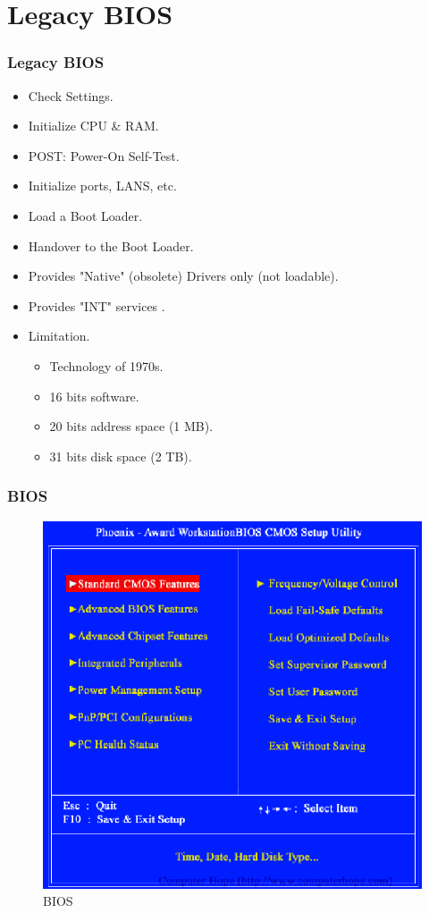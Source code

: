 \documentclass[aspectratio=169, xcolor=table, notheorems, hyperref={pdfpagelabels=false}]{beamer}
\begin{document}
\section{Legacy BIOS}
\begin{frame}
\frametitle{Legacy BIOS}
\begin{itemize}
\item Check Settings.
\item Initialize CPU \& RAM.
\item POST: Power-On Self-Test.
\item Initialize ports, LANS, etc.
\item Load a Boot Loader.
\item Handover to the Boot Loader.
\item Provides "Native" (obsolete) Drivers only (not loadable).
\item Provides "INT" services .
\item Limitation.
\begin{itemize}
\item Technology of 1970s.
\item 16 bits software.
\item 20 bits address space (1 MB).
\item 31 bits disk space (2 TB).
\end{itemize}
\end{itemize}


\end{frame}

\begin{frame}
\frametitle{BIOS}
\begin{figure}
\includegraphics[width=0.45\linewidth]{os03-BIOS}
\caption{BIOS}
\end{figure}
\end{frame}
\end{document}
